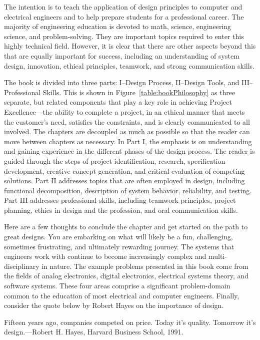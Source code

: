 The intention is to teach the application of design principles to
computer and electrical engineers and to help prepare students for a
professional career. The majority of engineering education is devoted to
math, science, engineering science, and problem-solving. They are
important topics required to enter this highly technical field. However,
it is clear that there are other aspects beyond this that are equally
important for success, including an understanding of system design,
innovation, ethical principles, teamwork, and strong communication
skills.

The book is divided into three parts: I--Design Process, II--Design
Tools, and III--Professional Skills. This is shown in Figure~\ref{table:bookPhilosophy}
 as three separate, but related components that play a key role in achieving
Project Excellence---the ability to complete a project, in an ethical
manner that meets the customer's need, satisfies the constraints, and is
clearly communicated to all involved. The chapters are decoupled as much
as possible so that the reader can move between chapters as necessary.
In Part I, the emphasis is on understanding and gaining experience in
the different phases of the design process. The reader is guided through
the steps of project identification, research, specification
development, creative concept generation, and critical evaluation of
competing solutions. Part II addresses topics that are often employed in
design, including functional decomposition, description of system
behavior, reliability, and testing. Part III addresses professional
skills, including teamwork principles, project planning, ethics in
design and the profession, and oral communication skills.

Here are a few thoughts to conclude the chapter and get started on the
path to great designs. You are embarking on what will likely be a fun,
challenging, sometimes frustrating, and ultimately rewarding journey.
The systems that engineers work with continue to become increasingly
complex and multi-disciplinary in nature. The example problems presented
in this book come from the fields of analog electronics, digital
electronics, electrical systems theory, and software systems. These four
areas comprise a significant problem-domain common to the education of
most electrical and computer engineers. Finally, consider the quote
below by Robert Hayes on the importance of design.

Fifteen years ago, companies competed on price. Today it's quality.
Tomorrow it's design.---Robert H. Hayes, Harvard Business School, 1991.

